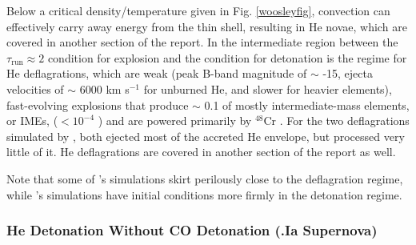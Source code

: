Below a critical density/temperature given in Fig. \ref{woosleyfig}, convection can effectively carry away energy from the thin shell, resulting in He novae, which are covered in another section of the report.  In the intermediate region between the $\tau_{\mathrm{run}} \approx 2$ condition for explosion and the condition for detonation is the regime for He deflagrations, which are weak (peak B-band magnitude of $\sim$ -15, ejecta velocities of $\sim$ 6000 km s$^{-1}$ for unburned He, and slower for heavier elements), fast-evolving explosions that produce $\sim$ 0.1 {\Msun} of mostly intermediate-mass elements, or IMEs, ($< 10^{-4}$ {\Msun} {\Ni}) and are powered primarily by $^{48}$Cr \citep{woosk10}.  For the two deflagrations simulated by \citeauthor{woosk10}, both ejected most of the accreted He envelope, but processed very little of it.  He deflagrations are covered in another section of the report as well.

Note that some of \cite{wald+10}'s simulations skirt perilously close to the deflagration regime, while \cite{shen+10}'s simulations have initial conditions more firmly in the detonation regime.

\subsubsection{He Detonation Without CO Detonation (.Ia Supernova)}


